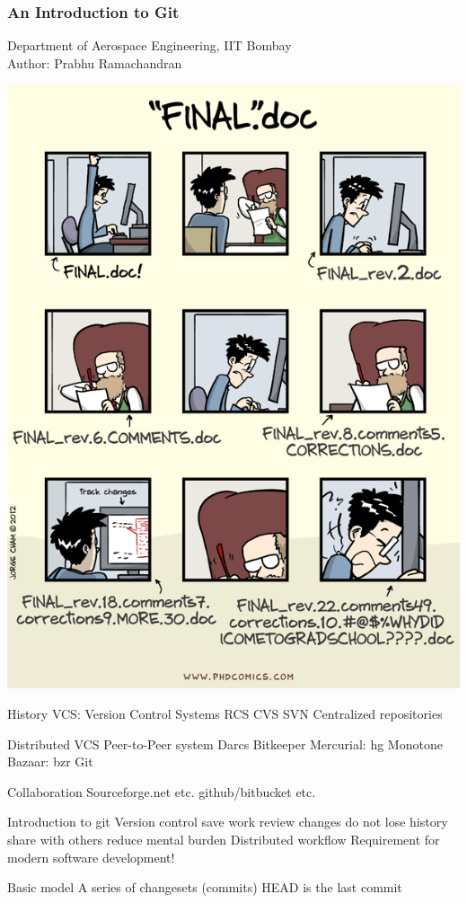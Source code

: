 \documentclass{beamer}
\begin{document}
\begin{frame}
\frametitle{An Introduction to Git}
Department of Aerospace Engineering, IIT Bombay\\
Author: Prabhu Ramachandran
\end{frame}
\begin{frame}
\includegraphics[scale=0.25]{git1}
\end{frame}

\begin{frame}
History
VCS: Version Control Systems
RCS
CVS
SVN
Centralized repositories
\end{frame}

\begin{frame}
Distributed VCS
Peer-to-Peer system
Darcs
Bitkeeper
Mercurial: hg
Monotone
Bazaar: bzr
Git
\end{frame}
\begin{frame}
Collaboration
Sourceforge.net etc.
github/bitbucket etc.
\end{frame}
\begin{frame}
Introduction to git
Version control
save work
review changes
do not lose history
share with others
reduce mental burden
Distributed workflow
Requirement for modern software development!
\end{frame}
\begin{frame}
Basic model
A series of changesets (commits)
HEAD is the last commit
\end{frame}





\end{document}
